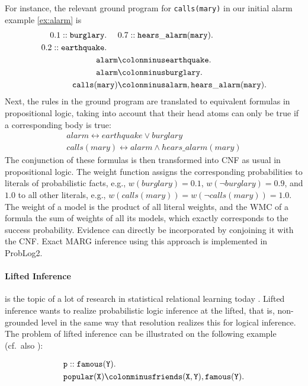 \documentclass[a4paper]{article}
\begin{document}
For instance, the relevant ground program for \verb|calls(mary)| in
our initial alarm example \eqref{ex:alarm} is 
\begin{align*}
0.1::\mathtt{burglary.} ~~~~&0.7::\mathtt{hears\_alarm(mary).} \\
0.2::\mathtt{earthquake.} ~~~~&\\
\mathtt{alarm}&\colonminus\mathtt{earthquake.}\\
\mathtt{alarm}&\colonminus\mathtt{burglary.}\\
\mathtt{calls(mary)}&\colonminus\mathtt{alarm, hears\_alarm(mary).}\\
\end{align*}
Next, the rules in the ground program are translated to equivalent
formulas in propositional logic, taking into account that their head
atoms can only be true if a corresponding body is true:
\begin{align*}
alarm \leftrightarrow earthquake \vee burglary \\
calls(mary) \leftrightarrow alarm\wedge hears\_alarm(mary)
\end{align*}
The conjunction of these formulas is then transformed into CNF as
usual in propositional logic. The weight function assigns the corresponding probabilities to
literals of probabilistic facts, e.g., $w(burglary)=0.1$, $w(\neg
burglary)=0.9$, and $1.0$ to all other literals, e.g.,
$w(calls(mary))=w(\neg calls(mary))=1.0$. The weight of a model is the
product of all literal weights, and the WMC of a formula the sum of
weights of all its models, which exactly corresponds to the success
probability. Evidence can directly be incorporated by conjoining it
with the CNF. 
Exact MARG inference using this approach is implemented in ProbLog2.


\paragraph{Lifted Inference} is the topic of a lot of research in statistical relational learning today \citep{kersting:ecai12,poole:ijcai03}.  Lifted inference wants to realize probabilistic logic inference
at the lifted, that is, non-grounded level in the same way that resolution realizes this for logical inference.
The problem of lifted inference can be illustrated on the following example (cf.~also \cite{Poole08}):

\begin{align*}
&\mathtt{p}::\mathtt{famous(Y).}\\
&\mathtt{popular(X)} \colonminus \mathtt{friends(X,Y), famous(Y).} 
\end{align*}
\end{document}
